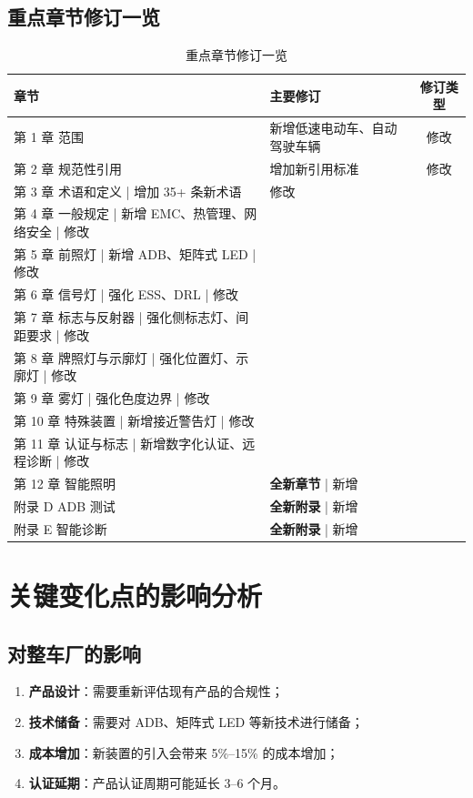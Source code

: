 \subsection{重点章节修订一览}

\begin{table}[H]
\centering
\caption{重点章节修订一览}
\small
\begin{tabularx}{\textwidth}{|l|X|c|}
\hline
\textbf{章节} & \textbf{主要修订} & \textbf{修订类型} \\
\hline
第 1 章 范围    & 新增低速电动车、自动驾驶车辆  & 修改 \\
\hline
第 2 章 规范性引用 & 增加新引用标准      & 修改 \\
\hline
第 3 章 术语和定义 | 增加 35+ 条新术语    & 修改 \\
\hline
第 4 章 一般规定  | 新增 EMC、热管理、网络安全  | 修改 \\
\hline
第 5 章 前照灯    | 新增 ADB、矩阵式 LED  | 修改 \\
\hline
第 6 章 信号灯   | 强化 ESS、DRL       | 修改 \\
\hline
第 7 章 标志与反射器 | 强化侧标志灯、间距要求  | 修改 \\
\hline
第 8 章 牌照灯与示廓灯 | 强化位置灯、示廓灯    | 修改 \\
\hline
第 9 章 雾灯     | 强化色度边界        | 修改 \\
\hline
第 10 章 特殊装置  | 新增接近警告灯       | 修改 \\
\hline
第 11 章 认证与标志  | 新增数字化认证、远程诊断  | 修改 \\
\hline
第 12 章 智能照明  & \textbf{全新章节}    | 新增 \\
\hline
附录 D ADB 测试  & \textbf{全新附录}    | 新增 \\
\hline
附录 E 智能诊断  & \textbf{全新附录}    | 新增 \\
\hline
\end{tabularx}
\end{table}

\section{关键变化点的影响分析}

\subsection{对整车厂的影响}

\begin{enumerate}[leftmargin=2em]
    \item \textbf{产品设计}：需要重新评估现有产品的合规性；
    \item \textbf{技术储备}：需要对 ADB、矩阵式 LED 等新技术进行储备；
    \item \textbf{成本增加}：新装置的引入会带来 5\%--15\% 的成本增加；
    \item \textbf{认证延期}：产品认证周期可能延长 3--6 个月。
\end{enumerate}


